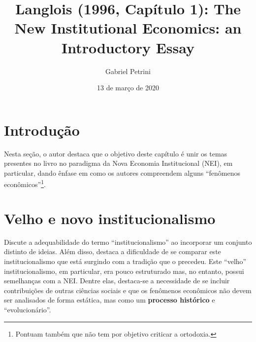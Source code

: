 \documentclass[9pt,twocolumn,twoside,lineno]{style}
\title{Langlois (1996, Capítulo 1): The New Institutional Economics: an Introductory Essay}
\date{13 de março de 2020}
\author[$\ddagger$]{Gabriel Petrini}
\affil[$\ddagger$]{Doutorando no instituto de Economia da Unicamp}
\begin{document}
\maketitle
\articletypemark
\marginmark
\thispagestyle{firststyle}


	
\section{Introdução}

Nesta seção, o autor destaca que o objetivo deste capítulo é unir os temas presentes no livro no paradigma da Nova Economia Institucional (NEI), em particular, dando ênfase em como os autores compreendem alguns ``fenômenos econômicos''\footnote{Pontuam também que não tem por objetivo criticar a ortodoxia.}.
	
\section{Velho e novo institucionalismo}

Discute a adequabilidade do termo ``institucionalismo'' ao incorporar um conjunto distinto de ideias. Além disso, destaca a dificuldade de se comparar este institucionalismo que está surgindo com a tradição que o precedeu. Este ``velho'' institucionalismo, em particular, era pouco estruturado mas, no entanto, possui semelhanças com a NEI. Dentre elas, destaca-se a necessidade de se incluir contribuições de outras ciências sociais e que os fenômenos econômicos não devem ser analisados de forma estática, mas como um \textbf{processo histórico} e ``evolucionário''.
\end{document}
